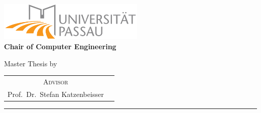\begin{titlepage}
    \centering
    \begin{onehalfspace}
    
        	\includegraphics[width=7cm]{images/uni-logo.png}\\
        	\vspace{1.0cm}
        	\large {\bfseries Chair of Computer Engineering} \\

        	\vspace{2.5cm}

            \begin{doublespace}
            	{\textsf{\Huge{\thetitle}}}
            \end{doublespace}

        	\vspace{2cm}

            \Large{Master Thesis by}\\

        	\vspace{1cm}

        	{\bfseries \large{\theauthor}}

        	\vfill

        	{\large
        		\begin{tabular}[l]{cc}
        			\textsc{Advisor}\\
        			Prof.~Dr.~Stefan Katzenbeisser
        		\end{tabular}
        	}

        	\vspace{1.5cm}

        	\parbox{\linewidth}{\hrule\strut}

            \vfill

	    {\thedate}
    	
    \end{onehalfspace}
\end{titlepage}
